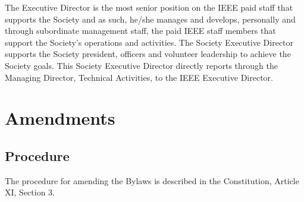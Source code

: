 \documentclass[10pt]{article}
\begin{document}
The Executive Director is the most senior position on the IEEE paid staff that supports the Society and as such, he/she manages and develops, personally and through subordinate management staff, the paid IEEE staff members that support the Society’s operations and activities.  The Society Executive Director supports the Society president, officers and volunteer leadership to achieve the Society goals. This Society Executive Director directly reports through the Managing Director, Technical Activities, to the IEEE Executive Director.


\section{Amendments}

\subsection{Procedure}

The procedure for amending the Bylaws is described in the Constitution, Article XI, Section 3. 
\end{document}
